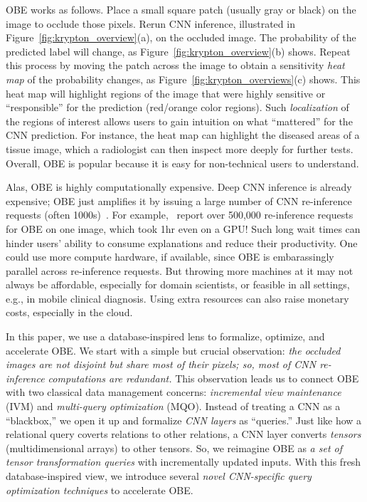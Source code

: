 OBE works as follows. Place a small square patch (usually gray or black) on the image to occlude those pixels. Rerun CNN inference, illustrated in Figure~\ref{fig:krypton_overview}(a), on the occluded image. The probability of the predicted label will change, as Figure~\ref{fig:krypton_overview}(b) shows. Repeat this process by moving the patch across the image to obtain a sensitivity \textit{heat map} of the probability changes, as Figure~\ref{fig:krypton_overviews}(c) shows. This heat map will highlight regions of the image that were highly sensitive or ``responsible'' for the prediction (red/orange color regions). Such \textit{localization} of the regions of interest allows users to gain intuition on what ``mattered'' for the CNN prediction. For instance, the heat map can highlight the diseased areas of a tissue image, which a radiologist can then inspect more deeply for further tests. Overall, OBE is popular because it is easy for non-technical users to understand.

Alas, OBE is highly computationally expensive. Deep CNN inference is already expensive; OBE just amplifies it by issuing a large number of CNN re-inference requests (often 1000s)~\cite{ketkar2017introduction}. For example,~\cite{zintgraf2017visualizing} report over 500,000 re-inference requests for OBE on one image, which took 1hr even on a GPU! Such long wait times can hinder users' ability to consume explanations and reduce their productivity. One could use more compute hardware, if available, since OBE is embarassingly parallel across re-inference requests. But throwing more machines at it may not always be affordable, especially for domain scientists, or feasible in all settings, e.g., in mobile clinical diagnosis. Using extra resources can also raise monetary costs, especially in the cloud.

In this paper, we use a database-inspired lens to formalize, optimize, and accelerate OBE. We start with a simple but crucial observation: \textit{the occluded images are not disjoint but share most of their pixels; so, most of CNN re-inference computations are redundant.} This observation leads us to connect OBE with two classical data management concerns: \textit{incremental view maintenance} (IVM) and \textit{multi-query optimization} (MQO). Instead of treating a CNN as a ``blackbox,'' we open it up and formalize \textit{CNN layers} as ``queries.'' Just like how a relational query coverts relations to other relations, a CNN layer converts \textit{tensors} (multidimensional arrays) to other tensors. So, we reimagine OBE as \textit{a set of tensor transformation queries} with incrementally updated inputs. With this fresh database-inspired view, we introduce several \textit{novel CNN-specific query optimization techniques} to accelerate OBE.


